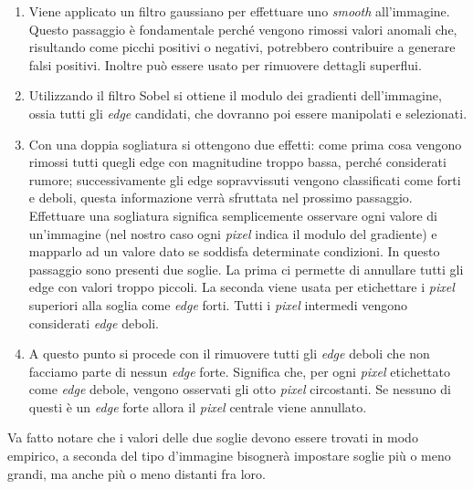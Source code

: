 \begin{enumerate}
  \item Viene applicato un filtro gaussiano per effettuare uno \textit{smooth} all'immagine.
    Questo passaggio è fondamentale perché vengono rimossi valori anomali che, risultando come picchi positivi o negativi, potrebbero contribuire a generare falsi positivi.
    Inoltre può essere usato per rimuovere dettagli superflui.

  \item Utilizzando il filtro Sobel si ottiene il modulo dei gradienti dell'immagine, ossia tutti gli \textit{edge} candidati, che dovranno poi essere manipolati e selezionati.


  \item Con una doppia sogliatura si ottengono due effetti:
    come prima cosa vengono rimossi tutti quegli edge con magnitudine troppo bassa, perché considerati rumore;
    successivamente gli edge sopravvissuti vengono classificati come forti e deboli, questa informazione verrà sfruttata nel prossimo passaggio.
    Effettuare una sogliatura significa semplicemente osservare ogni valore di un'immagine (nel nostro caso ogni \textit{pixel} indica il modulo del gradiente) e mapparlo ad un valore dato se soddisfa determinate condizioni.
    In questo passaggio sono presenti due soglie.
    La prima ci permette di annullare tutti gli edge con valori troppo piccoli.
    La seconda viene usata per etichettare i \textit{pixel} superiori alla soglia come \textit{edge} forti.
    Tutti i \textit{pixel} intermedi vengono considerati \textit{edge} deboli.

  \item A questo punto si procede con il rimuovere tutti gli \textit{edge} deboli che non facciamo parte di nessun \textit{edge} forte.
    Significa che, per ogni \textit{pixel} etichettato come \textit{edge} debole, vengono osservati gli otto \textit{pixel} circostanti.
    Se nessuno di questi è un \textit{edge} forte allora il \textit{pixel} centrale viene annullato.

\end{enumerate}
Va fatto notare che i valori delle due soglie devono essere trovati in modo empirico, a seconda del tipo d'immagine bisognerà impostare soglie più o meno grandi, ma anche più o meno distanti fra loro.

